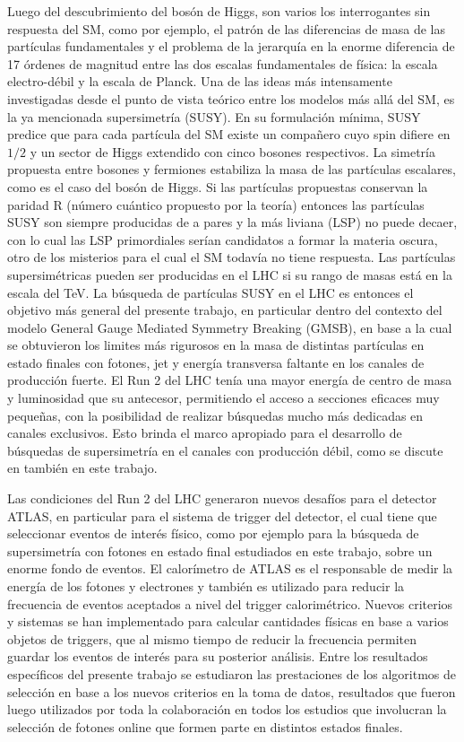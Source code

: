 Luego del descubrimiento del bosón de Higgs, son varios los interrogantes sin respuesta del 
SM, como por ejemplo, el patrón de las diferencias de masa de las partículas fundamentales y el problema de la jerarquía en la enorme diferencia de 17 órdenes de magnitud entre las dos escalas fundamentales de física: la escala electro-débil y la escala de Planck. Una de las ideas más intensamente investigadas desde el punto de vista teórico entre los modelos más allá del SM, es la ya mencionada supersimetría (SUSY). En su formulación mínima, SUSY predice que para cada partícula del SM existe un compañero cuyo spin difiere en $1/2$ y un sector de Higgs extendido con cinco bosones respectivos. La simetría propuesta entre bosones y fermiones estabiliza la masa de las partículas escalares, como es el caso del bosón de Higgs. Si las partículas propuestas conservan la paridad R (número cuántico propuesto por la teoría) entonces las partículas SUSY son siempre producidas de a pares y la más liviana (LSP) no puede decaer, con lo cual las LSP primordiales serían candidatos a formar la materia oscura, otro de los misterios para el cual el SM todavía no tiene respuesta. Las partículas supersimétricas pueden ser producidas en el LHC si su rango de masas está en la escala del TeV. La búsqueda de partículas SUSY en el LHC es entonces el objetivo más general del presente trabajo, en particular dentro del contexto del modelo General Gauge Mediated Symmetry Breaking (GMSB), en base a la cual se obtuvieron los limites más rigurosos en la masa de distintas partículas en estado finales con fotones, jet y energía transversa faltante en los canales de producción fuerte. El Run 2 del LHC tenía una mayor energía de centro de masa y luminosidad que su antecesor, permitiendo el acceso a secciones eficaces muy pequeñas, con la posibilidad de realizar búsquedas mucho más dedicadas en canales exclusivos. Esto brinda el marco apropiado para el desarrollo de búsquedas de supersimetría en el canales con producción débil, como se discute en también en este trabajo.

Las condiciones del Run 2 del LHC generaron nuevos desafíos para el detector ATLAS, en particular para el sistema de trigger del detector, el cual tiene que seleccionar eventos de interés físico, como por ejemplo para la búsqueda de supersimetría con fotones en estado final estudiados en este trabajo, sobre un enorme fondo de eventos. El calorímetro de ATLAS es el responsable de medir la energía de los fotones y electrones y también es utilizado para reducir la frecuencia de eventos aceptados a nivel del trigger calorimétrico. Nuevos criterios y sistemas se han implementado para calcular cantidades físicas en base a varios objetos de triggers, que al mismo tiempo de reducir la frecuencia permiten guardar los eventos de interés para su posterior análisis. Entre los resultados específicos del presente trabajo se estudiaron las prestaciones de los algoritmos de selección en base a los nuevos criterios en la toma de datos, resultados que fueron luego utilizados por toda la colaboración en todos los estudios que involucran la selección de fotones online que formen parte en distintos estados finales. 
